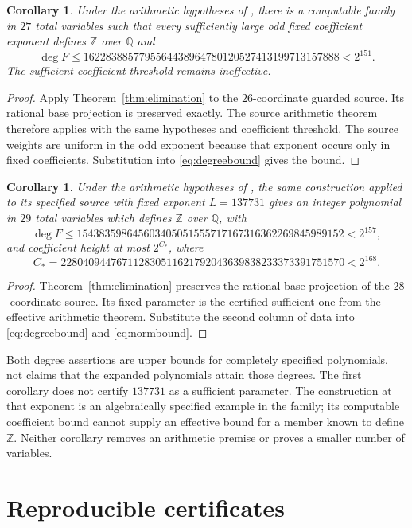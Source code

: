 \documentclass[11pt,a4paper]{article}
\newtheorem{corollary}[theorem]{Corollary}
\newcommand{\Q}{\mathbb Q}\newcommand{\Z}{\mathbb Z}
\begin{document}
\begin{corollary}\label{cor:27}
Under the arithmetic hypotheses of \cite{Source27}, there is a
computable family in $27$ total variables such that every sufficiently
large odd fixed coefficient exponent defines $\Z$ over $\Q$ and
\[
 \deg F\le
 1622838857795564438964780120527413199713157888<2^{151}.
\]
The sufficient coefficient threshold remains ineffective.
\end{corollary}
\begin{proof}
Apply Theorem~\ref{thm:elimination} to the $26$-coordinate guarded
source. Its rational base projection is preserved exactly.
The source arithmetic theorem therefore applies with the same
hypotheses and coefficient threshold. The source weights are uniform
in the odd exponent because that exponent occurs only in fixed
coefficients. Substitution into \eqref{eq:degreebound} gives the bound.
\end{proof}

\begin{corollary}\label{cor:29}
Under the arithmetic hypotheses of \cite{Source29}, the same
construction applied to its specified source with fixed exponent
$L=137731$ gives an integer polynomial in $29$ total variables
which defines $\Z$ over $\Q$, with
\[
 \deg F\le
 154383598645603405051555717167316362269845989152<2^{157},
\]
and coefficient height at most $2^{C_*}$, where
\[
 C_*=228040944767112830511621792043639838233373391751570<2^{168}.
\]
\end{corollary}
\begin{proof}
Theorem~\ref{thm:elimination} preserves the rational base projection
of the $28$-coordinate source. Its fixed parameter is the certified
sufficient one from the effective arithmetic theorem. Substitute
the second column of data into \eqref{eq:degreebound} and
\eqref{eq:normbound}.
\end{proof}

Both degree assertions are upper bounds for completely specified
polynomials, not claims that the expanded polynomials attain those
degrees. The first corollary does not certify $137731$ as a sufficient
parameter. The construction at that exponent is an algebraically
specified example in the family; its computable coefficient bound
cannot supply an effective bound for a member known to define
$\Z$. Neither corollary removes an arithmetic premise or proves
a smaller number of variables.

\section{Reproducible certificates}
\end{document}
